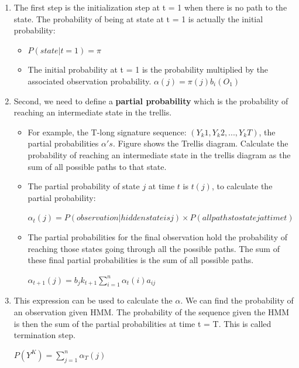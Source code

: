 \begin{enumerate}

\item The first step is the initialization step at t = 1 when there is no path to the state. The probability of being at state at t = 1 is actually the initial probability:
\begin{itemize}


 \item $P (state | t = 1) = \pi $
\item The initial probability at t = 1 is the probability multiplied by the associated observation probability.
$\alpha(j) = \pi(j) b_i (O_1)$
\end{itemize}

\item Second, we need to define a \textbf{partial probability} which is the probability of reaching an intermediate state in the trellis.

\begin{itemize}

\item For example, the T-long signature sequence: $(Y_k1, Y_k2,..., Y_kT)$, the partial probabilities $\alpha 's$. Figure shows the Trellis diagram. Calculate the probability of reaching an intermediate state in the trellis diagram as the sum of all possible paths to that state.

\item The partial probability of state $j$ at time $t$ is $t(j)$, to calculate the partial probability:

$\alpha_t(j) = P (observation | hidden state is j) \times P (all paths to state j at time t)$

\item The partial probabilities for the final observation hold the probability of reaching those states going through all the possible paths. The sum of these final partial probabilities is the sum of all possible paths. 

\hspace {4.5 cm}$\alpha_{t+1}(j) = b_jk_{t+1} \sum\limits^{n}_{i = 1} \alpha_t(i) a_{ij}$




\end{itemize}
\item This expression can be used to calculate the $\alpha$. We can find the probability of an observation given HMM. The probability of the sequence given the HMM is then the sum of the partial probabilities at time t = T. This is called termination step.
 
 \hspace {4.5 cm}$P(Y^K) = \sum\limits^{n}_{j=1} \alpha_T (j)$

\end{enumerate}







